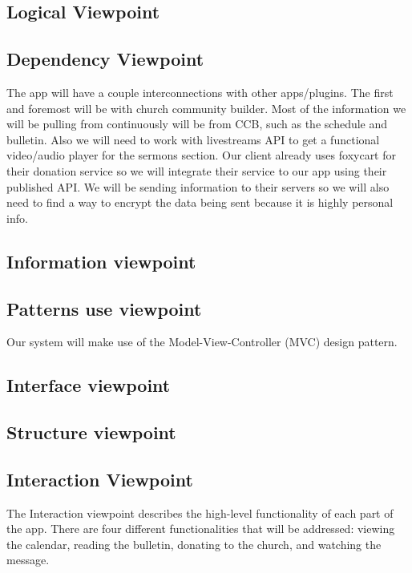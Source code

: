 \documentclass[letterpaper,10pt,draftclsnofoot,onecolumn,titlepage]{IEEEtran}
\begin{document}
		\subsection{Logical Viewpoint}

		\subsection{Dependency Viewpoint}
	The app will have a couple interconnections with other apps/plugins. 
	The first and foremost will be with church community builder. 
	Most of the information we will be pulling from continuously will be from CCB, such as the schedule and bulletin.  
	Also we will need to work with livestreams API to get a functional video/audio player for the sermons section. 
	Our client already uses foxycart for their donation service so we will integrate their service to our app using their published API. 
	We will be sending information to their servers so we will also need to find a way to encrypt the data being sent because it is highly personal info. 
		\subsection{Information viewpoint}

		\subsection{Patterns use viewpoint}
			Our system will make use of the Model-View-Controller (MVC) design pattern.

		\subsection{Interface viewpoint}

		\subsection{Structure viewpoint}

		\subsection{Interaction Viewpoint}
			The Interaction viewpoint describes the high-level functionality of each part of the app. 
			There are four different functionalities that will be addressed: viewing the calendar, reading the bulletin, donating to the church, and watching the message. 
			
\end{document}
